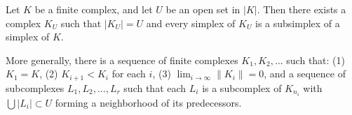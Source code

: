 Let $K$ be a finite complex, and let $U$ be an open set in $|K|$. Then there exists a complex $K_U$ such that $|K_U| = U$ and every simplex of $K_U$ is a subsimplex of a simplex of $K$.

More generally, there is a sequence of finite complexes $K_1, K_2, \ldots$ such that:
(1) $K_1 = K$,
(2) $K_{i+1} < K_i$ for each $i$,
(3) $\lim_{i \to \infty} \|K_i\| = 0$,
and a sequence of subcomplexes $L_1, L_2, \ldots, L_r$ such that each $L_i$ is a subcomplex of $K_{n_i}$ with $\bigcup |L_i| \subset U$ forming a neighborhood of its predecessors.
